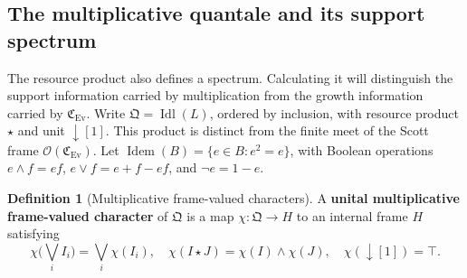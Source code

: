 \documentclass[11pt,a4paper]{article}
\numberwithin{algorithm}{section}
\numberwithin{equation}{section}
\theoremstyle{definition}
\newtheorem{definition}[definition]{Definition}
\theoremstyle{remark}
\theoremstyle{plain}
\newcommand{\OO}{\mathcal O}
\newcommand{\Idl}{\operatorname{Idl}}
\newcommand{\Ev}{{\operatorname{Ev}}}
\newcommand{\Cplx}{\mathfrak C_{\Ev}}
\theoremstyle{definition}
\theoremstyle{plain}
\begin{document}
\subsection{The multiplicative quantale and its support spectrum}
\label{sec:resource-quantale}
The resource product also defines a spectrum. Calculating it will
distinguish the support information carried by multiplication from the
growth information carried by $\Cplx$.
Write $\mathfrak Q=\Idl(L)$, ordered by inclusion, with resource product
$\star$ and unit $\downarrow[1]$. This product is distinct from the
finite meet of the Scott frame $\OO(\Cplx)$.
Let $\operatorname{Idem}(B)=\{e\in B:e^2=e\}$, with Boolean operations
$e\wedge f=ef$, $e\vee f=e+f-ef$, and $\neg e=1-e$.

\begin{definition}[Multiplicative frame-valued characters]\label{def:multiplicative-characters}
A \textbf{unital multiplicative frame-valued character} of
$\mathfrak Q$ is a map $\chi:\mathfrak Q\to H$ to an internal
frame $H$ satisfying
\[
 \chi\bigl(\bigvee_iI_i\bigr)=\bigvee_i\chi(I_i),\quad
 \chi(I\star J)=\chi(I)\wedge\chi(J),\quad
 \chi(\downarrow[1])=\top.
\]
\end{definition}
\end{document}

